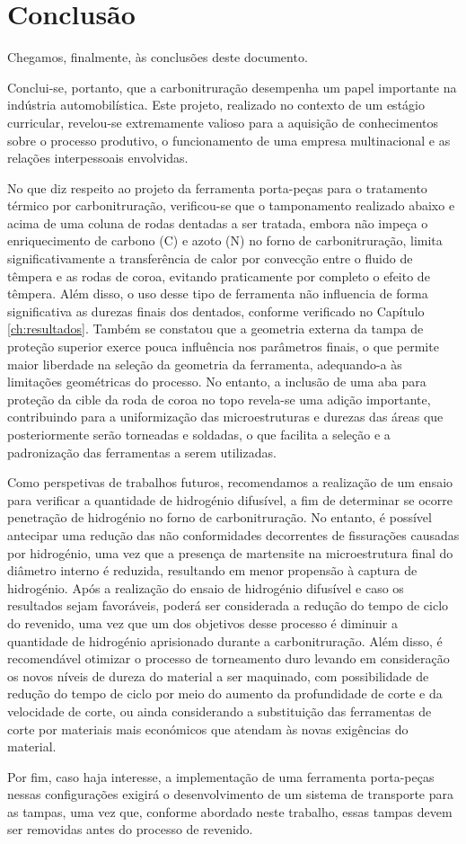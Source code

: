\chapter{Conclusão} \label{ch:conclusao}
\setlength{\headheight}{13.6pt}
Chegamos, finalmente, às conclusões deste documento.
\par
Conclui-se, portanto, que a carbonitruração desempenha um papel importante na indústria automobilística. Este projeto, realizado no contexto de um estágio curricular, revelou-se extremamente valioso para a aquisição de conhecimentos sobre o processo produtivo, o funcionamento de uma empresa multinacional e as relações interpessoais envolvidas.
\par
No que diz respeito ao projeto da ferramenta porta-peças para o tratamento térmico por carbonitruração, verificou-se que o tamponamento realizado abaixo e acima de uma coluna de rodas dentadas a ser tratada, embora não impeça o enriquecimento de carbono (C) e azoto (N) no forno de carbonitruração, limita significativamente a transferência de calor por convecção entre o fluido de têmpera e as rodas de coroa, evitando praticamente por completo o efeito de têmpera. Além disso, o uso desse tipo de ferramenta não influencia de forma significativa as durezas finais dos dentados, conforme verificado no Capítulo \ref{ch:resultados}. Também se constatou que a geometria externa da tampa de proteção superior exerce pouca influência nos parâmetros finais, o que permite maior liberdade na seleção da geometria da ferramenta, adequando-a às limitações geométricas do processo. No entanto, a inclusão de uma aba para proteção da cible da roda de coroa no topo revela-se uma adição importante, contribuindo para a uniformização das microestruturas e durezas das áreas que posteriormente serão torneadas e soldadas, o que facilita a seleção e a padronização das ferramentas a serem utilizadas.
\par
Como perspetivas de trabalhos futuros, recomendamos a realização de um ensaio para verificar a quantidade de hidrogénio difusível, a fim de determinar se ocorre penetração de hidrogénio no forno de carbonitruração. No entanto, é possível antecipar uma redução das não conformidades decorrentes de fissurações causadas por hidrogénio, uma vez que a presença de martensite na microestrutura final do diâmetro interno é reduzida, resultando em menor propensão à captura de hidrogénio. Após a realização do ensaio de hidrogénio difusível e caso os resultados sejam favoráveis, poderá ser considerada a redução do tempo de ciclo do revenido, uma vez que um dos objetivos desse processo é diminuir a quantidade de hidrogénio aprisionado durante a carbonitruração. Além disso, é recomendável otimizar o processo de torneamento duro levando em consideração os novos níveis de dureza do material a ser maquinado, com possibilidade de redução do tempo de ciclo por meio do aumento da profundidade de corte e da velocidade de corte, ou ainda considerando a substituição das ferramentas de corte por materiais mais económicos que atendam às novas exigências do material.
\par
Por fim, caso haja interesse, a implementação de uma ferramenta porta-peças nessas configurações exigirá o desenvolvimento de um sistema de transporte para as tampas, uma vez que, conforme abordado neste trabalho, essas tampas devem ser removidas antes do processo de revenido.